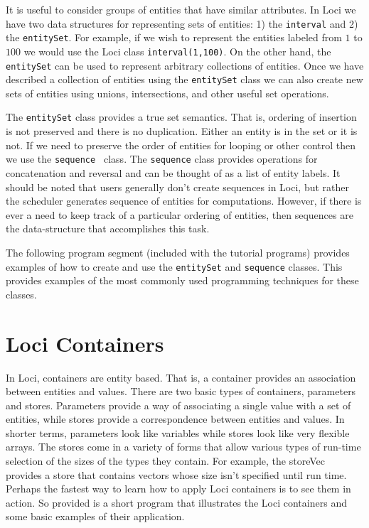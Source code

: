 \documentclass[10pt,epsf]{book}
\begin{document}
It is useful to consider groups of entities that have similar
attributes.  In Loci we have two data structures for representing sets
of entities:  1) the {\tt interval} and 2) the {\tt entitySet}.  For
example, if we wish to represent the entities labeled from $1$ to
$100$ we would use the Loci class {\tt interval(1,100)}.  On the other
hand, the {\tt entitySet} can be used to represent arbitrary
collections of entities.  Once we have described a collection of
entities using the {\tt entitySet} class we can also create new sets
of entities using unions, intersections, and other useful set
operations.  

The {\tt entitySet} class provides a true set semantics.
That is, ordering of insertion is not preserved and there is no
duplication.  Either an entity is in the set or it is not.  If we need
to preserve the order of entities for looping or other control then we
use the {\tt sequence } class.  The {\tt sequence} class provides
operations for concatenation and reversal and can be thought
of as a list of entity labels.  It should be noted that users
generally don't create sequences in Loci, but rather the scheduler
generates sequence of entities for computations.  However, if there is
ever a need to keep track of a particular ordering of entities, then
sequences are the data-structure that accomplishes this task.

The following program segment (included with the tutorial programs)
provides examples of how to create and use the {\tt  entitySet} and
{\tt sequence} classes.  This provides examples of the most commonly
used programming techniques for these classes.



\section{Loci Containers}

In Loci, containers are entity based.  That is, a container provides
an association between entities and values.  There are two basic types
of containers, parameters and stores.  Parameters provide a way of
associating a single value with a set of entities, while stores
provide a correspondence between entities and values.  In shorter
terms, parameters look like variables while stores look like very
flexible arrays.  The stores come in a variety of forms that allow
various types of run-time selection of the sizes of the types they
contain.  For example, the storeVec provides a store that contains
vectors whose size isn't specified until %
run time.  Perhaps the
fastest way to learn how to apply Loci containers is to see them in
action.  So provided is a short program that illustrates the Loci
containers and some basic examples of their application.
\end{document}
